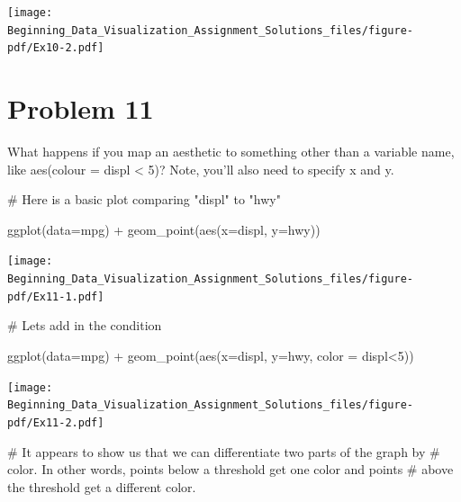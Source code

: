\documentclass[
  letterpaper,
  DIV=11,
  numbers=noendperiod]{scrreprt}
\newenvironment{Shaded}{\begin{snugshade}}{\end{snugshade}}
\newcommand{\AttributeTok}[1]{\textcolor[rgb]{0.40,0.45,0.13}{#1}}
\newcommand{\CommentTok}[1]{\textcolor[rgb]{0.37,0.37,0.37}{#1}}
\newcommand{\DecValTok}[1]{\textcolor[rgb]{0.68,0.00,0.00}{#1}}
\newcommand{\FunctionTok}[1]{\textcolor[rgb]{0.28,0.35,0.67}{#1}}
\newcommand{\NormalTok}[1]{\textcolor[rgb]{0.00,0.23,0.31}{#1}}
\newcommand{\SpecialCharTok}[1]{\textcolor[rgb]{0.37,0.37,0.37}{#1}}
\begin{document}
\texttt{[image: Beginning\_Data\_Visualization\_Assignment\_Solutions\_files/figure-pdf/Ex10-2.pdf]}

\section*{Problem 11}\label{problem-11-3}


What happens if you map an aesthetic to something other than a variable
name, like aes(colour = displ \textless{} 5)? Note, you'll also need to
specify x and y.

\begin{Shaded}
\begin{Highlighting}[]
\CommentTok{\# Here is a basic plot comparing "displ" to "hwy"}

\FunctionTok{ggplot}\NormalTok{(}\AttributeTok{data=}\NormalTok{mpg) }\SpecialCharTok{+}
  \FunctionTok{geom\_point}\NormalTok{(}\FunctionTok{aes}\NormalTok{(}\AttributeTok{x=}\NormalTok{displ, }\AttributeTok{y=}\NormalTok{hwy))}
\end{Highlighting}
\end{Shaded}

\texttt{[image: Beginning\_Data\_Visualization\_Assignment\_Solutions\_files/figure-pdf/Ex11-1.pdf]}

\begin{Shaded}
\begin{Highlighting}[]
\CommentTok{\# Let\textquotesingle{}s add in the condition }

\FunctionTok{ggplot}\NormalTok{(}\AttributeTok{data=}\NormalTok{mpg) }\SpecialCharTok{+}
  \FunctionTok{geom\_point}\NormalTok{(}\FunctionTok{aes}\NormalTok{(}\AttributeTok{x=}\NormalTok{displ, }\AttributeTok{y=}\NormalTok{hwy, }\AttributeTok{color =}\NormalTok{ displ}\SpecialCharTok{\textless{}}\DecValTok{5}\NormalTok{))}
\end{Highlighting}
\end{Shaded}

\texttt{[image: Beginning\_Data\_Visualization\_Assignment\_Solutions\_files/figure-pdf/Ex11-2.pdf]}

\begin{Shaded}
\begin{Highlighting}[]
\CommentTok{\# It appears to show us that we can differentiate two parts of the graph by }
\CommentTok{\# color. In other words, points below a threshold get one color and points}
\CommentTok{\# above the threshold get a different color.}
\end{Highlighting}
\end{Shaded}
\end{document}
